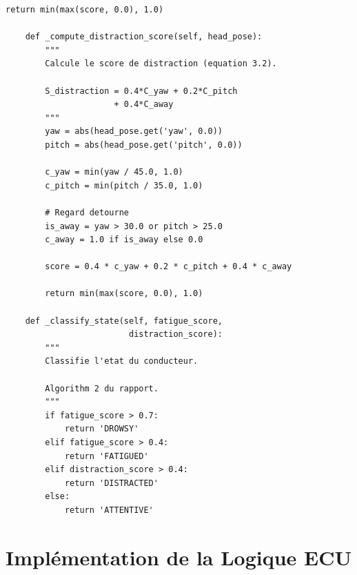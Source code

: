 \begin{lstlisting}[style=pythonstyle, caption={Module d'analyse comportementale.}, label={lst:behavioral}]
        return min(max(score, 0.0), 1.0)
    
    def _compute_distraction_score(self, head_pose):
        """
        Calcule le score de distraction (equation 3.2).
        
        S_distraction = 0.4*C_yaw + 0.2*C_pitch 
                      + 0.4*C_away
        """
        yaw = abs(head_pose.get('yaw', 0.0))
        pitch = abs(head_pose.get('pitch', 0.0))
        
        c_yaw = min(yaw / 45.0, 1.0)
        c_pitch = min(pitch / 35.0, 1.0)
        
        # Regard detourne
        is_away = yaw > 30.0 or pitch > 25.0
        c_away = 1.0 if is_away else 0.0
        
        score = 0.4 * c_yaw + 0.2 * c_pitch + 0.4 * c_away
        
        return min(max(score, 0.0), 1.0)
    
    def _classify_state(self, fatigue_score, 
                         distraction_score):
        """
        Classifie l'etat du conducteur.
        
        Algorithm 2 du rapport.
        """
        if fatigue_score > 0.7:
            return 'DROWSY'
        elif fatigue_score > 0.4:
            return 'FATIGUED'
        elif distraction_score > 0.4:
            return 'DISTRACTED'
        else:
            return 'ATTENTIVE'
\end{lstlisting}

\section{Implémentation de la Logique ECU}

